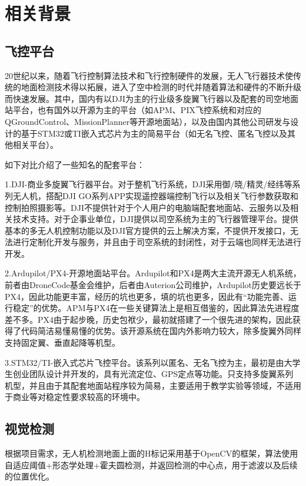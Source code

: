 \chapter{相关背景}
\section{飞控平台}

20世纪以来，随着飞行控制算法技术和飞行控制硬件的发展，无人飞行器技术使传统的地面检测技术得以拓展，进入了空中检测的时代并随着算法和硬件的不断升级而快速发展。其中，国内有以DJI为主的行业级多旋翼飞行器以及配套的司空地面站平台，也有国外以开源为主的平台（如APM、PIX飞控系统和对应的QGroundControl、MissionPlanner等开源地面站），以及由国内其他公司研发与设计的基于STM32或TI嵌入式芯片为主的简易平台（如无名飞控、匿名飞控以及其他相关平台）。

如下对比介绍了一些知名的配套平台：

1.DJI-商业多旋翼飞行器平台。对于整机飞行系统，DJI采用御/晓/精灵/经纬等系列无人机，搭配DJI GO系列APP实现遥控器端控制飞行以及相关飞行参数获取和控制拍照摄影等。DJI不提供针对于个人用户的电脑端配套地面站、云服务以及相关技术支持。对于企事业单位，DJI提供以司空系统为主的飞行器管理平台。提供基本的多无人机控制功能以及DJI官方提供的云上解决方案，不提供开发接口，无法进行定制化开发与服务，并且由于司空系统的封闭性，对于云端也同样无法进行开发。

2.Ardupilot/PX4-开源地面站平台。Ardupilot和PX4是两大主流开源无人机系统，前者由DroneCode基金会维护，后者由Auterion公司维护，Ardupilot历史要远长于PX4，因此功能更丰富，经历的坑也更多，填的坑也更多，因此有“功能完善、运行稳定”的优势。APM与PX4在一些关键算法上是相互借鉴的，因此算法先进程度差不多。PX4由于起步晚，历史包袱少，最初就搭建了一个很先进的架构，因此获得了代码简洁易懂易懂的优势。该开源系统在国内外影响力较大，除多旋翼外同样支持固定翼、垂直起降等机型。

3.STM32/TI-嵌入式芯片飞控平台。该系列以匿名、无名飞控为主，最初是由大学生创业团队设计并开发的，具有光流定位、GPS定点等功能。只支持多旋翼系列机型，并且由于其配套地面站程序较为简易，主要适用于教学实验等领域，不适用于商业等对稳定性要求较高的环境中。

\section{视觉检测}

根据项目需求，无人机检测地面上面的H标记采用基于OpenCV的框架，算法使用自适应阈值+形态学处理+霍夫圆检测，并返回检测的中心点，用于滤波以及后续的位置优化。

